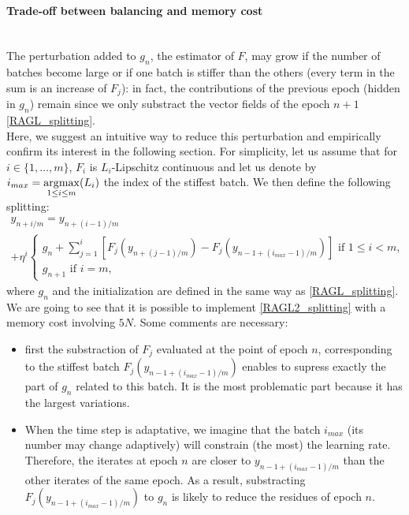 \paragraph{Trade-off between balancing and memory cost}
~~\\
The perturbation added to $g_n$, the estimator of $F$, may grow if the number of batches become large or if one batch is stiffer than the others (every term in the sum is an increase of $F_j$): in fact, the contributions of the previous epoch (hidden in $g_n$) remain since we only substract the vector fields of the epoch $n+1$ \eqref{RAGL_splitting}. \\ 
Here, we suggest an intuitive way to reduce this perturbation and empirically confirm its interest in the following section. For simplicity, let us assume that for $i\in \{1,\dots,m\}$, $F_i$ is $L_i$-Lipschitz continuous and let us denote by $i_{max} = \displaystyle{\operatorname*{\arg\!\max}_{1 \leq i \leq m}} (L_i)$ the index of the stiffest batch. We then define the following splitting:
\begin{multline}
	y_{n+i/m} = y_{n+(i-1)/m} \\
	+\eta^i
	\left\{
	\begin{array}{ll}
		g_n+\displaystyle{\sum_{j=1}^i} \left[F_j\left(y_{n+(j-1)/m}\right)-F_j\left(y_{n-1+(i_{max}-1)/m}\right)\right] \text{ if } 1\leq i<m,\\
		g_{n+1} \text{ if } i=m,
	\end{array}
	\right.
	\label{RAGL2_splitting}
\end{multline}
where $g_n$ and the initialization are defined in the same way as \eqref{RAGL_splitting}. We are going to see that it is possible to implement \eqref{RAGL2_splitting} with a memory cost involving $5N$.
Some comments are necessary:
\begin{itemize}
	\item first the substraction of $F_j$ evaluated at the point of epoch $n$, corresponding to the stiffest batch $F_j\left(y_{n-1+(i_{max}-1)/m}\right)$ enables to supress exactly the part of $g_n$ related to this batch. It is the most problematic part because it has the largest variations.
	\item When the time step is adaptative, we imagine that the batch $i_{max}$ (its number may change adaptively) will constrain (the most) the learning rate. Therefore, the
          iterates at epoch $n$ are closer to $y_{n-1+(i_{max}-1)/m}$ than the other iterates of the same epoch. As a result, substracting $F_j\left(y_{n-1+(i_{max}-1)/m}\right)$ to $g_n$ is likely to reduce the residues of epoch $n$.
\end{itemize} 

